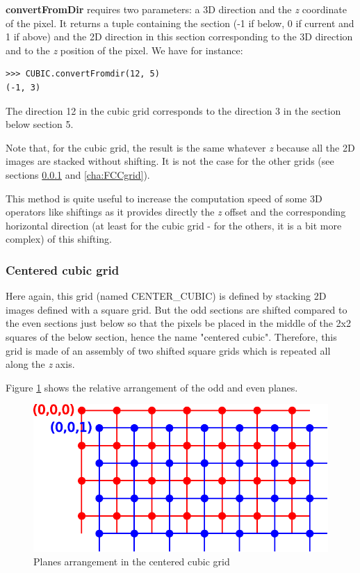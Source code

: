 \documentclass[a4paper,10pt,oneside]{article}
\begin{document}
\textbf{convertFromDir} requires two parameters: a 3D direction and the \emph{z} coordinate of the pixel. It returns a tuple containing the section
(-1 if below, 0 if current and 1 if above) and the 2D direction in this section corresponding to the 3D direction and to the \emph{z} position of the
pixel. We have for instance:

\lstset{language=Python}
\begin{lstlisting}
>>> CUBIC.convertFromdir(12, 5)
(-1, 3)
\end{lstlisting}

The direction 12 in the cubic grid corresponds to the direction 3 in the section below section 5.

Note that, for the cubic grid, the result is the same whatever \emph{z} because all the 2D images are stacked without shifting. It is
not the case for the other grids (see sections \ref{cha:CCgrid} and \ref{cha:FCCgrid}).

This method is quite useful to increase the computation speed of some 3D operators like shiftings as it provides directly
the \emph{z} offset and the corresponding horizontal direction (at least for the cubic grid - for the others, it is a bit more complex)
of this shifting.

\subsubsection{Centered cubic grid}
\label{cha:CCgrid}
Here again, this grid (named CENTER\_CUBIC) is defined by stacking 2D images defined with a square grid. But the odd sections
are shifted compared to the even sections just below so that the pixels be placed in the middle of the 2x2 squares of the below
section, hence the name "centered cubic". Therefore, this grid is made of an assembly of two shifted square grids which is
repeated all along the \emph{z} axis.

Figure \ref{fig:CC_grid} shows the relative arrangement of the odd and even planes.

\begin{figure}
\centering
\includegraphics[scale=0.8]{figures/CC_grid.pdf}
\caption{Planes arrangement in the centered cubic grid}
\label{fig:CC_grid}
\end{figure}
\end{document}
